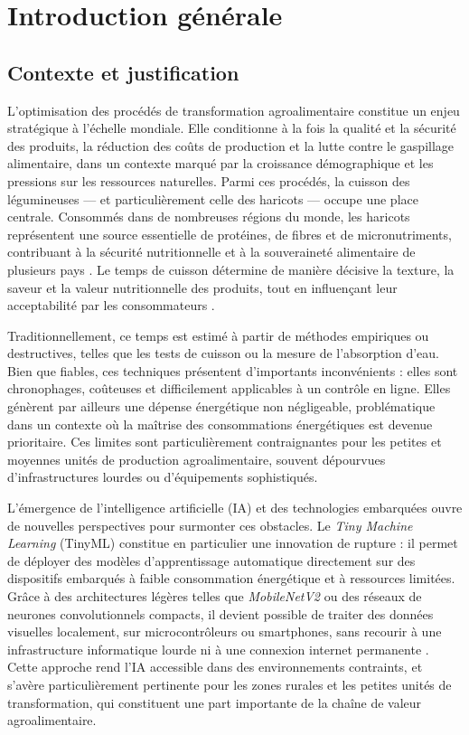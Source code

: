 \chapter{Introduction g\'en\'erale}
\label{chap:Introduction généerale}

\section{Contexte et justification}
L’optimisation des procédés de transformation agroalimentaire constitue un enjeu stratégique à l’échelle mondiale. Elle conditionne à la fois la qualité et la sécurité des produits, la réduction des coûts de production et la lutte contre le gaspillage alimentaire, dans un contexte marqué par la croissance démographique et les pressions sur les ressources naturelles. Parmi ces procédés, la cuisson des légumineuses — et particulièrement celle des haricots — occupe une place centrale. Consommés dans de nombreuses régions du monde, les haricots représentent une source essentielle de protéines, de fibres et de micronutriments, contribuant à la sécurité nutritionnelle et à la souveraineté alimentaire de plusieurs pays \cite{mendoza2018prediction}. Le temps de cuisson détermine de manière décisive la texture, la saveur et la valeur nutritionnelle des produits, tout en influençant leur acceptabilité par les consommateurs \cite{mbofung2012proximate}.

Traditionnellement, ce temps est estimé à partir de méthodes empiriques ou destructives, telles que les tests de cuisson ou la mesure de l’absorption d’eau. Bien que fiables, ces techniques présentent d’importants inconvénients : elles sont chronophages, coûteuses et difficilement applicables à un contrôle en ligne. Elles génèrent par ailleurs une dépense énergétique non négligeable, problématique dans un contexte où la maîtrise des consommations énergétiques est devenue prioritaire. Ces limites sont particulièrement contraignantes pour les petites et moyennes unités de production agroalimentaire, souvent dépourvues d’infrastructures lourdes ou d’équipements sophistiqués.

L’émergence de l’intelligence artificielle (IA) et des technologies embarquées ouvre de nouvelles perspectives pour surmonter ces obstacles. Le \textit{Tiny Machine Learning} (TinyML) constitue en particulier une innovation de rupture : il permet de déployer des modèles d’apprentissage automatique directement sur des dispositifs embarqués à faible consommation énergétique et à ressources limitées. Grâce à des architectures légères telles que \textit{MobileNetV2} ou des réseaux de neurones convolutionnels compacts, il devient possible de traiter des données visuelles localement, sur microcontrôleurs ou smartphones, sans recourir à une infrastructure informatique lourde ni à une connexion internet permanente \cite{banbury2021micronets}. Cette approche rend l’IA accessible dans des environnements contraints, et s’avère particulièrement pertinente pour les zones rurales et les petites unités de transformation, qui constituent une part importante de la chaîne de valeur agroalimentaire.

